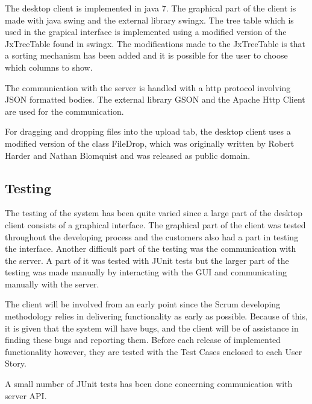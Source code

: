 The desktop client is implemented in java 7. The graphical part of the client is made with java swing and the external library swingx. The tree table which is used in the grapical interface is implemented using a modified version of the JxTreeTable found in swingx. The modifications made to the JxTreeTable is that a sorting mechanism has been added and it is possible for the user to choose which columns to show.

The communication with the server is handled with a http protocol involving JSON formatted bodies. The external library GSON and the Apache Http Client are used for the communication.

For dragging and dropping files into the upload tab, the desktop client uses a modified version of the class FileDrop, which was originally written by Robert Harder and Nathan Blomquist and was released as public domain.

\subsection{Testing}

The testing of the system has been quite varied since a large part of the desktop client consists of a graphical interface. The graphical part of the client was tested throughout the developing process and the customers also had a part in testing the interface. Another difficult part of the testing was the communication with the server. A part of it was tested with JUnit tests but the larger part of the testing was made manually by interacting with the GUI and communicating manually with the server.

The client will be involved from an early point since the Scrum developing methodology relies in delivering functionality as early as possible. Because of this, it is given that the system will have bugs, and the client will be of assistance in finding these bugs and reporting them. Before each release of implemented functionality however, they are tested with the Test Cases enclosed to each User Story.

A small number of JUnit tests has been done concerning communication with server API.

\FloatBarrier
